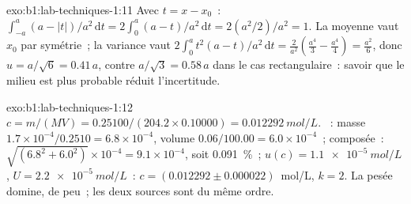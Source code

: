 \begin{solution}{exo:b1:lab-techniques-1:11}
Avec $t = x - x_0$~: $\int_{-a}^{a} (a - |t|)/a^2 \,\mathrm{d}t =
2 \int_0^a (a - t)/a^2 \,\mathrm{d}t = 2 (a^2/2)/a^2 = 1$. La moyenne
vaut
$x_0$ par symétrie~; la variance vaut $2 \int_0^a t^2 (a - t)/a^2
\,\mathrm{d}t = \frac{2}{a^2}\left(\frac{a^4}{3} - \frac{a^4}{4}\right) =
\frac{a^2}{6}$, donc $u = a/\sqrt6 = 0.41\,a$, contre $a/\sqrt3 = 0.58\,a$
dans le cas rectangulaire~: savoir que le milieu est plus probable
réduit l'incertitude.
\end{solution}

\begin{solution}{exo:b1:lab-techniques-1:12}
$c = m/(MV) = 0.25100/(204.2 \times 0.10000) = \qty{0.012292}{mol/L}$.
~: masse $1.7 \times 10^{-4}/0.2510 = 6.8 \times
10^{-4}$, volume $0.06/100.00 = 6.0 \times 10^{-4}$~; composée~:
$\sqrt{(6.8^2 + 6.0^2)} \times 10^{-4} = 9.1 \times 10^{-4}$, soit
\qty{0.091}{\percent}~; $u(c) = \qty{1.1e-5}{mol/L}$, $U = \qty{2.2e-5}{mol/L}$~:
$c = (0.012292 \pm 0.000022)$~mol/L, $k = 2$. La pesée domine, de
peu~; les deux sources sont du même ordre.
\end{solution}

